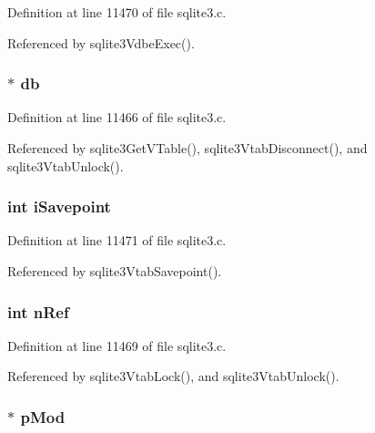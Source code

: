 Definition at line 11470 of file sqlite3.\+c.



Referenced by sqlite3\+Vdbe\+Exec().

\hypertarget{struct_v_table_ad6e663497d2c934364b3bcf07496b30b}{}
\subsubsection[{db}]{$\ast$ db}\label{struct_v_table_ad6e663497d2c934364b3bcf07496b30b}


Definition at line 11466 of file sqlite3.\+c.



Referenced by sqlite3\+Get\+V\+Table(), sqlite3\+Vtab\+Disconnect(), and sqlite3\+Vtab\+Unlock().

\hypertarget{struct_v_table_a174369225809cd2e8afe034fa8926f60}{}
\subsubsection[{i\+Savepoint}]{\setlength{\rightskip}{0pt plus 5cm}int i\+Savepoint}\label{struct_v_table_a174369225809cd2e8afe034fa8926f60}


Definition at line 11471 of file sqlite3.\+c.



Referenced by sqlite3\+Vtab\+Savepoint().

\hypertarget{struct_v_table_a3c459f9ae278c22b72583c55ca01acb7}{}
\subsubsection[{n\+Ref}]{\setlength{\rightskip}{0pt plus 5cm}int n\+Ref}\label{struct_v_table_a3c459f9ae278c22b72583c55ca01acb7}


Definition at line 11469 of file sqlite3.\+c.



Referenced by sqlite3\+Vtab\+Lock(), and sqlite3\+Vtab\+Unlock().

\hypertarget{struct_v_table_af1b94c576b400ad171ed0e14e42a3908}{}
\subsubsection[{p\+Mod}]{$\ast$ p\+Mod}\label{struct_v_table_af1b94c576b400ad171ed0e14e42a3908}


